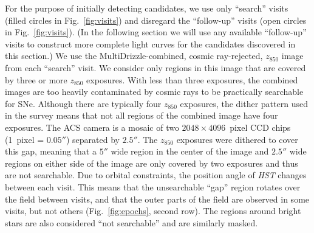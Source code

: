 

For the purpose of initially detecting candidates, we use only
``search'' visits (filled circles in Fig.~\ref{fig:visits}) and
disregard the ``follow-up'' visits (open circles in
Fig.~\ref{fig:visits}). (In the following section we will use any
available ``follow-up'' visits to construct more complete light curves
for the candidates discovered in this section.) We use the {\sc
MultiDrizzle}-combined, cosmic ray-rejected, $z_{850}$ image from each
``search'' visit. We consider only regions in this image that are
covered by three or more $z_{850}$ exposures.  With less than three
exposures, the combined images are too heavily contaminated by cosmic
rays to be practically searchable for SNe. Although there are
typically four $z_{850}$ exposures, the dither pattern used in the
survey means that not all regions of the combined image have four
exposures. The ACS camera is a mosaic of two $2048 \times 4096$~pixel
CCD chips (1~pixel = $0.05''$) separated by $2.5''$. The $z_{850}$
exposures were dithered to cover this gap, meaning that a $5''$ wide
region in the center of the image and $2.5''$ wide regions on either
side of the image are only covered by two exposures and thus are not
searchable. Due to orbital constraints, the position angle of {\it HST}
changes between each visit. This means that the unsearchable ``gap''
region rotates over the field between visits, and that the outer parts
of the field are observed in some visits, but not others
(Fig.~\ref{fig:epochs}, second row). The regions around bright stars
are also considered ``not searchable'' and are similarly masked.

